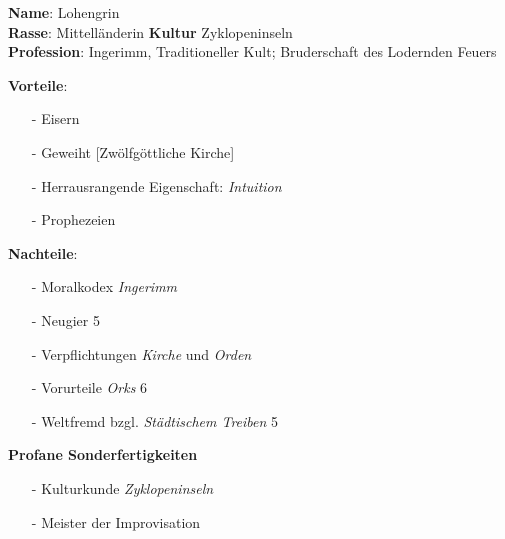 \documentclass{article}
\begin{document}
  \begin{mycolorbox}
    \textbf{Name}: Lohengrin\\
    \textbf{Rasse}: Mittelländerin \hfill \textbf{Kultur} Zyklopeninseln\\
    \textbf{Profession}: Ingerimm, Traditioneller Kult; Bruderschaft des Lodernden Feuers
  \end{mycolorbox}

  \begin{mycolorbox}
    \textbf{Vorteile}:
    \begin{itemize}
      \item[-] Eisern
      \item[-] Geweiht [Zwölfgöttliche Kirche]
      \item[-] Herrausrangende Eigenschaft: \textit{Intuition}
      \item[-] Prophezeien
    \end{itemize}
    \textbf{Nachteile}:
    \begin{itemize}
      \item[-] Moralkodex \textit{Ingerimm}
      \item[-] Neugier 5
      \item[-] Verpflichtungen \textit{Kirche} und \textit{Orden}
      \item[-] Vorurteile \textit{Orks} 6
      \item[-] Weltfremd bzgl. \textit{Städtischem Treiben} 5
    \end{itemize}
    \textbf{Profane Sonderfertigkeiten}
    \begin{itemize}
      \item[-] Kulturkunde \textit{Zyklopeninseln}
      \item[-] Meister der Improvisation
    \end{itemize}
  \end{mycolorbox}
\end{document}
